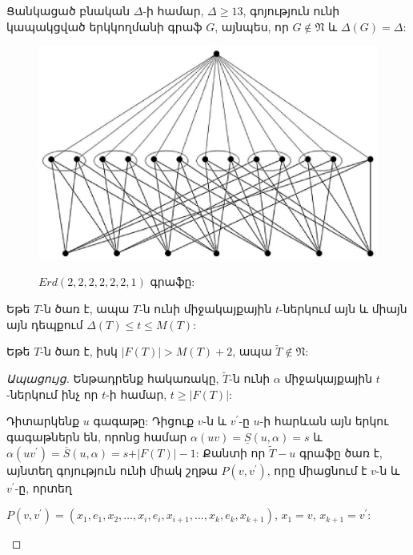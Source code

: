 \begin{hide}
\begin{corollary}
\label{c3_Erdos} Ցանկացած բնական $\Delta$-ի համար, $\Delta \geq 13$,
գոյություն ունի կապակցված երկկողմանի գրաֆ $G$, այնպես, որ $G\notin \mathfrak{N}$
և $\Delta(G)=\Delta$:
\end{corollary}

\begin{figure}[h]
\begin{center}
\includegraphics[width=30pc]{figures/erd6x2_1.eps}\\
\caption{$Erd(2,2,2,2,2,2,1)$ գրաֆը:}\label{f3_Erd6x2_1}
\end{center}
\end{figure}
\begin{theorem}
\label{t3_Kamalian_tree} Եթե $T$-ն ծառ է, ապա $T$-ն ունի միջակայքային $t$-ներկում այն և միայն այն դեպքում $\Delta(T)\leq t\leq M(T)$:
\end{theorem}

\begin{theorem}
\label{t3_tree} Եթե $T$-ն ծառ է, իսկ $\vert F(T)\vert >
M(T)+2$, ապա $\widetilde{T}\notin \mathfrak{N}$:
\end{theorem}
\begin{proof}[Ապացույց]
Ենթադրենք հակառակը, $\widetilde{T}$-ն ունի $\alpha$ միջակայքային $t$-ներկում ինչ որ $t$-ի համար, $t\geq \vert F(T)\vert$:

Դիտարկենք $u$ գագաթը: Դիցուք $v$-ն և $v^{\prime}$-ը $u$-ի հարևան այն երկու գագաթներն են, որոնց համար $\alpha(uv)=\underline{S}(u,\alpha)=s$ և
$\alpha(uv^{\prime})=\overline{S}(u,\alpha)=s+\vert F(T)\vert-1$: Քանտի որ $\widetilde{T}-u$ գրաֆը ծառ է, այնտեղ գոյություն ունի միակ շղթա
$P(v,v^{\prime})$, որը միացնում է $v$-ն և $v^{\prime}$-ը, որտեղ
\begin{center}
$P(v,v^{\prime})=(x_{1},e_{1},x_{2},\ldots,x_{i},e_{i},x_{i+1},\ldots,x_{k},e_{k},x_{k+1})$,
$x_{1}=v$, $x_{k+1}=v^{\prime}$:
\end{center}


\end{proof}
\end{hide}
